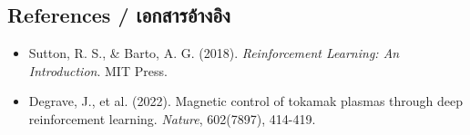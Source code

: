 \subsection{References \quad / \quad \textthai{เอกสารอ้างอิง}}
\begin{itemize}
    \item Sutton, R. S., \& Barto, A. G. (2018). \textit{Reinforcement Learning: An Introduction}. MIT Press.
    \item Degrave, J., et al. (2022). Magnetic control of tokamak plasmas through deep reinforcement learning. \textit{Nature}, 602(7897), 414-419.
\end{itemize}
